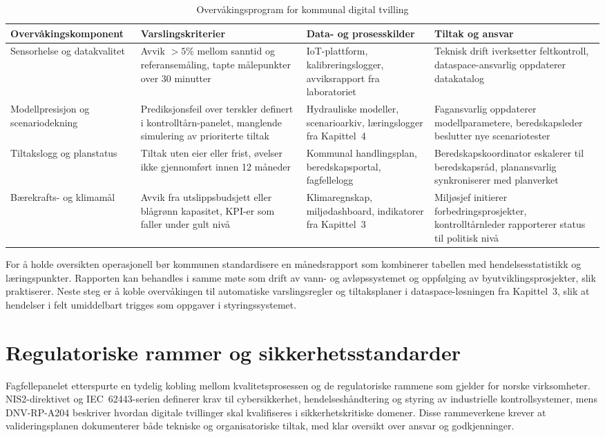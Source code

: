 \begin{table}[ht]
    \centering
    \caption{Overvåkingsprogram for kommunal digital tvilling}
    \label{tab:kommunal-overvaking}
    \begin{tabular}{|p{3.2cm}|p{4.6cm}|p{4.6cm}|p{3.0cm}|}
        \hline
        \textbf{Overvåkingskomponent} & \textbf{Varslingskriterier} & \textbf{Data- og prosesskilder} & \textbf{Tiltak og ansvar} \\
        \hline
        Sensorhelse og datakvalitet & Avvik \(>5\%\) mellom sanntid og referansemåling, tapte målepunkter over 30 minutter & IoT-plattform, kalibreringslogger, avviksrapport fra laboratoriet & Teknisk drift iverksetter feltkontroll, dataspace-ansvarlig oppdaterer datakatalog \\
        \hline
        Modellpresisjon og scenariodekning & Prediksjonsfeil over terskler definert i kontrolltårn-panelet, manglende simulering av prioriterte tiltak & Hydrauliske modeller, scenarioarkiv, læringslogger fra Kapittel~4 & Fagansvarlig oppdaterer modellparametere, beredskapsleder beslutter nye scenariotester \\
        \hline
        Tiltakslogg og planstatus & Tiltak uten eier eller frist, øvelser ikke gjennomført innen 12 måneder & Kommunal handlingsplan, beredskapsportal, fagfellelogg & Beredskapskoordinator eskalerer til beredskapsråd, planansvarlig synkroniserer med planverket \\
        \hline
        Bærekrafts- og klimamål & Avvik fra utslippsbudsjett eller blågrønn kapasitet, KPI-er som faller under gult nivå & Klimaregnskap, miljødashboard, indikatorer fra Kapittel~3 & Miljøsjef initierer forbedringsprosjekter, kontrolltårnleder rapporterer status til politisk nivå \\
        \hline
    \end{tabular}
\end{table}

For å holde oversikten operasjonell bør kommunen standardisere en månedsrapport som kombinerer tabellen med hendelsesstatistikk og læringspunkter. Rapporten kan behandles i samme møte som drift av vann- og avløpssystemet og oppfølging av byutviklingsprosjekter, slik \citet{oslo2023overvann} praktiserer. Neste steg er å koble overvåkingen til automatiske varslingsregler og tiltaksplaner i dataspace-løsningen fra Kapittel~3, slik at hendelser i felt umiddelbart trigges som oppgaver i styringssystemet.

\section{Regulatoriske rammer og sikkerhetsstandarder}
Fagfellepanelet etterspurte en tydelig kobling mellom kvalitetsprosessen og de regulatoriske rammene som gjelder for norske virksomheter. NIS2-direktivet og IEC~62443-serien definerer krav til cybersikkerhet, hendelseshåndtering og styring av industrielle kontrollsystemer, mens DNV-RP-A204 beskriver hvordan digitale tvillinger skal kvalifiseres i sikkerhetskritiske domener.\citep{eu2022nis2,iec62443-2-1,dnv2021a204} Disse rammeverkene krever at valideringsplanen dokumenterer både tekniske og organisatoriske tiltak, med klar oversikt over ansvar og godkjenninger.

